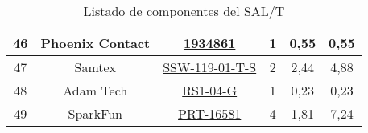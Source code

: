 \begin{table}[H]
\begin{tabular}{|c|c|c|c|c|c|}
46                   & Phoenix Contact     & \href{https://www.phoenixcontact.com/us/products/1934861/pdf}{1934861}                                                                                                                                                 & 1        & 0,55            & 0,55            \\ \hline
47                   & Samtex              & \href{https://www.mouser.fr/datasheet/2/527/ssw_th-2854740.pdf}{SSW-119-01-T-S}                                                                                                                                       & 2        & 2,44            & 4,88            \\ \hline
48                   & Adam Tech           & \href{https://www.mouser.fr/datasheet/2/4/rs1_xx_g_data_sheet-3396051.pdf}{RS1-04-G}                                                                                                                               & 1        & 0,23            & 0,23            \\ \hline
49                   & SparkFun            & \href{https://www.mouser.fr/ProductDetail/SparkFun/PRT-16581?qs=sPbYRqrBIVmf2mq2gyI4eA\%3D\%3D}{PRT-16581}                                                                                                             & 4        & 1,81            & 7,24       \\ \hline

\end{tabular}
\caption{Listado de componentes del SAL/T}
\label{tab:bom}
\end{table}
